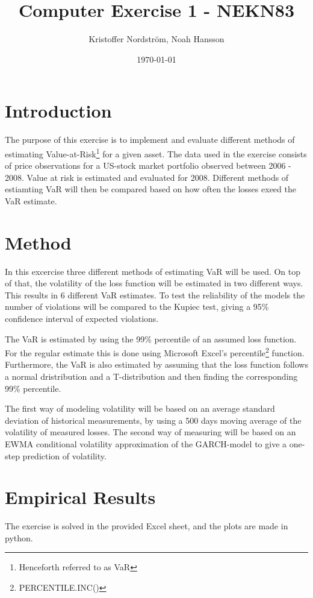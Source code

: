 \documentclass[a4paper]{article}
\title{Computer Exercise 1 - NEKN83}
\author{Kristoffer Nordström, Noah Hansson}
\date{\today}
\begin{document}
\maketitle

\section{Introduction}
The purpose of this exercise is to implement and evaluate different methods of estimating Value-at-Risk\footnote{Henceforth referred to as VaR} for a given asset. The data used in the exercise consists of price observations for a US-stock market portfolio observed between 2006 - 2008. Value at risk is estimated and evaluated for 2008. Different methods of estiamting VaR will then be compared based on how often the losses exeed the VaR estimate.

\section{Method}
In this excercise three different methods of estimating VaR will be used. On top of that, the volatility of the loss function will be estimated in two different ways. This results in 6 different VaR estimates. To test the reliability of the models the number of violations will be compared to the Kupiec test, giving a 95\% confidence interval of expected violations.

The VaR is estimated by using the 99\% percentile of an assumed loss function. For the regular estimate this is done using Microsoft Excel's percentile\footnote{PERCENTILE.INC()} function. Furthermore, the VaR is also estimated by assuming that the loss function follows a normal dristribution and a T-distribution and then finding the corresponding 99\% percentile.

The first way of modeling volatility will be based on an average standard deviation of historical measurements, by using a 500 days moving average of the volatility of measured losses. The second way of measuring will be based on an EWMA conditional volatility approximation of the GARCH-model to give a one-step prediction of volatility.



\section{Empirical Results}
The exercise is solved in the provided Excel sheet, and the plots are made in python. 
\end{document}
